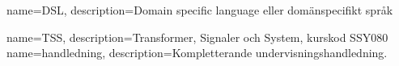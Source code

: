 {
    name=DSL,
    description={Domain specific language eller domänspecifikt språk}
}

{
    name=TSS,
    description={Transformer, Signaler och System, kurskod SSY080}
}
{
	name=handledning,
	description={Kompletterande undervisningshandledning.}
}
